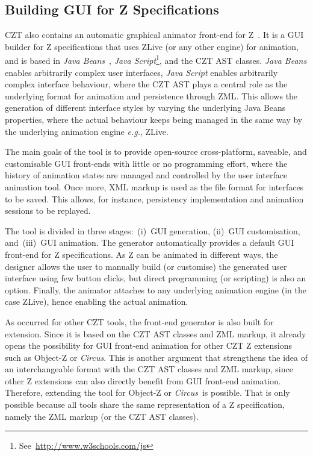 \documentclass{llncs}
\newcommand{\Circus}{{\sf\slshape Circus}}
\begin{document}
\subsection{Building GUI for Z Specifications}



    CZT also contains an automatic graphical animator front-end for
    Z~\cite{daley2003}.  It is a GUI builder for Z specifications that
    uses ZLive (or any other engine) for animation, and is based in
    \textit{Java Beans}~\cite{javabeans}, \textit{Java
    Script}\footnote{See~\url{http://www.w3schools.com/js}}, and the
    CZT AST classes. \textit{Java Beans} enables arbitrarily complex
    user interfaces, \textit{Java Script} enables arbitrarily complex
    interface behaviour, where the CZT AST plays a central role as the
    underlying format for animation and persistence through ZML.  This
    allows the generation of different interface styles by varying the
    underlying Java Beans properties, where the actual behaviour keeps
    being managed in the same way by the underlying animation engine
    \textit{e.g.}, ZLive.

    The main goals of the tool is to provide open-source
    cross-platform, saveable, and customisable GUI front-ends with
    little or no programming effort, where the history of animation
    states are managed and controlled by the user interface animation
    tool.  Once more, XML markup is used as the file format for
    interfaces to be saved.  This allows, for instance, persistency
    implementation and animation sessions to be replayed.

    The tool is divided in three stages:~(i)~GUI generation, (ii)~GUI
    customisation, and~(iii)~GUI animation. The generator
    automatically provides a default GUI front-end for Z
    specifications. As Z can be animated in different ways, the
    designer allows the user to manually build (or customise) the
    generated user interface using few button clicks, but direct
    programming (or scripting) is also an option.  Finally, the
    animator attaches to any underlying animation engine (in the case
    ZLive), hence enabling the actual animation.

    As occurred for other CZT tools, the front-end generator is also
    built for extension.  Since it is based on the CZT AST classes and
    ZML markup, it already opens the possibility for GUI front-end
    animation for other CZT Z extensions such as Object-Z or \Circus.
    This is another argument that strengthens the idea of an
    interchangeable format with the CZT AST classes and ZML markup,
    since other Z extensions can also directly benefit from GUI
    front-end animation. Therefore, extending the tool for Object-Z or
    \Circus\ is possible. That is only possible because all tools
    share the same representation of a Z specification, namely the ZML
    markup (or the CZT AST classes).
\end{document}
